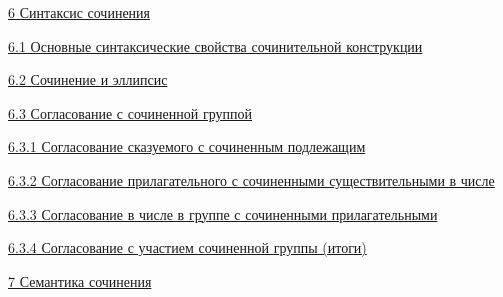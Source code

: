 \protect\hyperlink{ux441ux438ux43dux442ux430ux43aux441ux438ux441-ux441ux43eux447ux438ux43dux435ux43dux438ux44f}{6
Синтаксис сочинения}

\protect\hyperlink{ux43eux441ux43dux43eux432ux43dux44bux435-ux441ux438ux43dux442ux430ux43aux441ux438ux447ux435ux441ux43aux438ux435-ux441ux432ux43eux439ux441ux442ux432ux430-ux441ux43eux447ux438ux43dux438ux442ux435ux43bux44cux43dux43eux439-ux43aux43eux43dux441ux442ux440ux443ux43aux446ux438ux438}{6.1
Основные синтаксические свойства сочинительной конструкции}

\protect\hyperlink{ux441ux43eux447ux438ux43dux435ux43dux438ux435-ux438-ux44dux43bux43bux438ux43fux441ux438ux441}{6.2
Сочинение и эллипсис}

\protect\hyperlink{ux441ux43eux433ux43bux430ux441ux43eux432ux430ux43dux438ux435-ux441-ux441ux43eux447ux438ux43dux435ux43dux43dux43eux439-ux433ux440ux443ux43fux43fux43eux439}{6.3
Согласование с сочиненной группой}

\protect\hyperlink{ux441ux43eux433ux43bux430ux441ux43eux432ux430ux43dux438ux435-ux441ux43aux430ux437ux443ux435ux43cux43eux433ux43e-ux441-ux441ux43eux447ux438ux43dux435ux43dux43dux44bux43c-ux43fux43eux434ux43bux435ux436ux430ux449ux438ux43c}{6.3.1
Согласование сказуемого с сочиненным подлежащим}

\protect\hyperlink{ux441ux43eux433ux43bux430ux441ux43eux432ux430ux43dux438ux435-ux43fux440ux438ux43bux430ux433ux430ux442ux435ux43bux44cux43dux43eux433ux43e-ux441-ux441ux43eux447ux438ux43dux435ux43dux43dux44bux43cux438-ux441ux443ux449ux435ux441ux442ux432ux438ux442ux435ux43bux44cux43dux44bux43cux438-ux432-ux447ux438ux441ux43bux435}{6.3.2
Согласование прилагательного с сочиненными существительными в числе}

\protect\hyperlink{ux441ux43eux433ux43bux430ux441ux43eux432ux430ux43dux438ux435-ux432-ux447ux438ux441ux43bux435-ux432-ux433ux440ux443ux43fux43fux435-ux441-ux441ux43eux447ux438ux43dux435ux43dux43dux44bux43cux438-ux43fux440ux438ux43bux430ux433ux430ux442ux435ux43bux44cux43dux44bux43cux438}{6.3.3
Согласование в числе в группе с сочиненными прилагательными}

\protect\hyperlink{ux441ux43eux433ux43bux430ux441ux43eux432ux430ux43dux438ux435-ux441-ux443ux447ux430ux441ux442ux438ux435ux43c-ux441ux43eux447ux438ux43dux435ux43dux43dux43eux439-ux433ux440ux443ux43fux43fux44b-ux438ux442ux43eux433ux438}{6.3.4
Согласование с участием сочиненной группы (итоги)}

\protect\hyperlink{ux441ux435ux43cux430ux43dux442ux438ux43aux430-ux441ux43eux447ux438ux43dux435ux43dux438ux44f}{7
Семантика сочинения}

